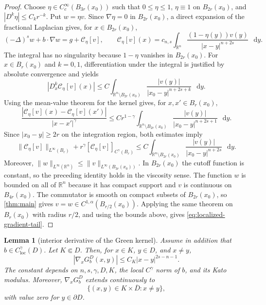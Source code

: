 \documentclass[reqno]{amsart}
\numberwithin{equation}{section}
\theoremstyle{plain}
\newtheorem{lemma}[theorem]{Lemma}
\theoremstyle{definition}
\theoremstyle{remark}
\newcommand{\R}{\mathbb R}
\newcommand{\differential}{\mathop{}\!\mathrm d}
\newcommand{\rev}[1]{#1}
\begin{document}
\begin{proof}
Choose $\eta\in C_c^\infty(B_{3r}(x_0))$ such that
$0\le\eta\le1$, $\eta\equiv1$ on $B_{2r}(x_0)$, and
$|D^k\eta|\le C_kr^{-k}$.  Put $w=\eta v$.  Since $\nabla\eta=0$ in
$B_{2r}(x_0)$, a direct expansion of the fractional Laplacian gives, for
$x\in B_{2r}(x_0)$,
\[
 (-\Delta)^sw+b\cdot\nabla w
 =g+\mathcal C_\eta[v],
\qquad
 \mathcal C_\eta[v](x)
 =c_{n,s}\int_{\R^n}
 \frac{(1-\eta(y))v(y)}{|x-y|^{n+2s}}\,\differential y.
\]
The integral has no singularity because $1-\eta$ vanishes in
$B_{2r}(x_0)$.  For $x\in B_r(x_0)$ and $k=0,1$, differentiation under the
integral is justified by absolute convergence and yields
\[
 |D_x^k\mathcal C_\eta[v](x)|
 \le C\int_{\R^n\setminus B_{2r}(x_0)}
 \frac{|v(y)|}{|x_0-y|^{n+2s+k}}\,\differential y.
\]
Using the mean-value theorem for the kernel gives, for $x,x'\in B_r(x_0)$,
\[
 \frac{|\mathcal C_\eta[v](x)-\mathcal C_\eta[v](x')|}
 {|x-x'|^\gamma}
 \le Cr^{1-\gamma}
 \int_{\R^n\setminus B_{2r}(x_0)}
 \frac{|v(y)|}{|x_0-y|^{n+2s+1}}\,\differential y.
\]
Since $|x_0-y|\ge2r$ on the integration region, both estimates imply
\[
 \|\mathcal C_\eta[v]\|_{L^\infty(B_r)}
 +r^\gamma[\mathcal C_\eta[v]]_{C^\gamma(B_r)}
 \le C\int_{\R^n\setminus B_{2r}(x_0)}
 \frac{|v(y)|}{|x_0-y|^{n+2s}}\,\differential y.
\]
Moreover,
$\|w\|_{L^\infty(\R^n)}\le\|v\|_{L^\infty(B_{3r}(x_0))}$.
In $B_{2r}(x_0)$ the cutoff function is constant, so the preceding identity
holds in the viscosity sense.  The function $w$ is bounded on all of $\R^n$
because it has compact support and $v$ is continuous on $B_{4r}(x_0)$.
\rev{The commutator is smooth on compact subsets of $B_{2r}(x_0)$, so
\cref{thm:main} gives $v=w\in C^{1,\alpha}(B_{r/2}(x_0))$.  Applying the
same theorem on $B_r(x_0)$ with radius $r/2$, and using the bounds above,
gives \eqref{eq:localized-gradient-tail}.}
\end{proof}

\begin{lemma}[interior derivative of the Green kernel]
\label{lem:green-gradient}
Assume in addition that $b\in C^\gamma_{\mathrm{loc}}(D)$.  Let
$K\Subset D$.  Then, for $x\in K$, $y\in D$, and $x\ne y$,
\begin{equation}\label{eq:green-gradient}
 |\nabla_xG_b^D(x,y)|
 \le C_K |x-y|^{2s-n-1}.
\end{equation}
The constant depends on $n,s,\gamma,D,K$, the local $C^\gamma$ norm of $b$,
and its Kato modulus.
\rev{Moreover, $\nabla_xG_b^D$ extends continuously to
\[
 \{(x,y)\in K\times\overline D:x\ne y\},
\]
with value zero for $y\in\partial D$.}
\end{lemma}
\end{document}
